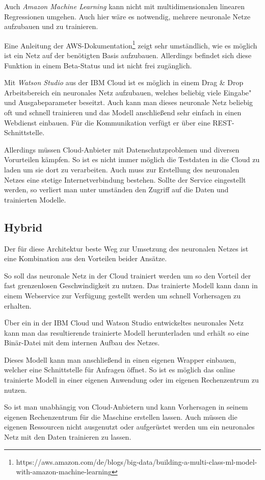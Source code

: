 Auch \textit{Amazon Machine Learning} kann nicht mit multidimensionalen linearen Regressionen umgehen. Auch hier wäre es
notwendig, mehrere neuronale Netze aufzubauen und zu trainieren.

Eine Anleitung der
AWS-Dokumentation\footnote{https://aws.amazon.com/de/blogs/big-data/building-a-multi-class-ml-model-with-amazon-machine-learning}
zeigt sehr umständlich, wie es möglich ist ein Netz auf der benötigten Basis aufzubauen. Allerdings befindet sich diese
Funktion in einem Beta-Status und ist nicht frei zugänglich.

Mit \textit{Watson Studio} aus der IBM Cloud ist es möglich in einem Drag \& Drop Arbeitsbereich ein neuronales Netz
aufzubauen, welches beliebig viele Eingabe"~ und Ausgabeparameter beseitzt. Auch kann man dieses neuronale Netz beliebig
oft und schnell trainieren und das Modell anschließend sehr einfach in einen Webdienst einbauen. Für die Kommunikation
verfügt er über eine REST-Schnittstelle.

Allerdings müssen Cloud-Anbieter mit Datenschutzproblemen und diversen Vorurteilen kämpfen. So ist es nicht immer
möglich die Testdaten in die Cloud zu laden um sie dort zu verarbeiten. Auch muss zur Erstellung des neuronalen Netzes
eine stetige Internetverbindung bestehen. Sollte der Service eingestellt werden, so verliert man unter umständen den
Zugriff auf die Daten und trainierten Modelle.

\subsection{Hybrid}
Der für diese Architektur beste Weg zur Umsetzung des neuronalen Netzes ist eine Kombination aus den Vorteilen beider
Ansätze.

So soll das neuronale Netz in der Cloud trainiert werden um so den Vorteil der fast grenzenlosen Geschwindigkeit zu
nutzen. Das trainierte Modell kann dann in einem Webservice zur Verfügung gestellt werden um schnell Vorhersagen zu
erhalten.

Über ein in der IBM Cloud und Watson Studio entwickeltes neuronales Netz kann man das resultierende trainierte Modell
herunterladen und erhält so eine Binär-Datei mit dem internen Aufbau des Netzes.

Dieses Modell kann man anschließend in einen eigenen Wrapper einbauen, welcher eine Schnittstelle für Anfragen öffnet.
So ist es möglich das online trainierte Modell in einer eigenen Anwendung oder im eigenen Rechenzentrum zu nutzen.

So ist man unabhängig von Cloud-Anbietern und kann Vorhersagen in seinem eigenen Rechenzentrum für die Maschine
erstellen lassen. Auch müssen die eigenen Ressourcen nicht ausgenutzt oder aufgerüstet werden um ein neuronales Netz mit
den Daten trainieren zu lassen.